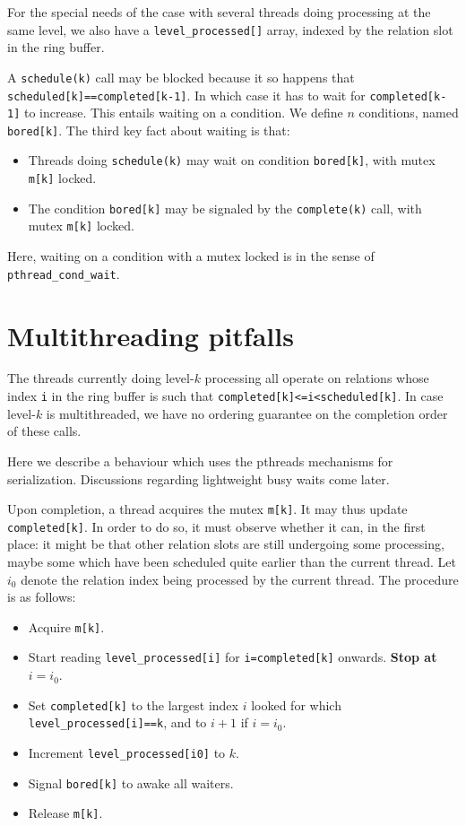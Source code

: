 \documentclass[10pt]{article}
\def\code#1{\texttt{#1}}
\begin{document}
For the special needs of the case with several threads doing processing
at the same level, we also have a \verb|level_processed[]| array, indexed
by the relation slot in the ring buffer. 



A \texttt{schedule(k)} call may be blocked because it so happens that
\verb|scheduled[k]==completed[k-1]|. In which case it has to wait for
\verb|completed[k-1]| to increase. This entails waiting on a condition.
We define $n$ conditions, named \verb|bored[k]|. The third key fact about
waiting is that:

\begin{itemize}
    \item Threads doing \code{schedule(k)} may wait on condition
        \verb|bored[k]|, with mutex \verb|m[k]| locked.
    \item The condition \verb|bored[k]| may be signaled by the
        \code{complete(k)} call, with mutex \verb|m[k]| locked.
\end{itemize}

Here, waiting on a condition with a mutex locked is in the sense of
\code{pthread\_cond\_wait}.


\section{Multithreading pitfalls}

The threads currently doing level-$k$ processing all operate on relations
whose index \texttt{i} in the ring buffer is such that
\verb|completed[k]<=i<scheduled[k]|. In case level-$k$ is multithreaded,
we have no ordering guarantee on the completion order of these calls.

Here we describe a behaviour which uses the pthreads mechanisms for
serialization. Discussions regarding lightweight busy waits come later.

Upon completion, a thread acquires the mutex \verb|m[k]|. It may thus
update \verb|completed[k]|. In order to do so, it must observe whether it
can, in the first place: it might be that other relation slots are still
undergoing some processing, maybe some which have been scheduled quite
earlier than the current thread. Let $i_0$ denote the relation index
being processed by the current thread. The procedure is as follows:
\begin{itemize}
    \item Acquire \verb|m[k]|.
    \item Start reading \verb|level_processed[i]| for
        \verb|i=completed[k]| onwards. \textbf{Stop at $i=i_0$}.
    \item Set \verb|completed[k]| to the largest index $i$ looked for which
        \verb|level_processed[i]==k|, and to $i+1$ if $i=i_0$.
    \item Increment \verb|level_processed[i0]| to $k$.
    \item Signal \verb|bored[k]| to awake all waiters.
    \item Release \verb|m[k]|.
\end{itemize}
\end{document}
